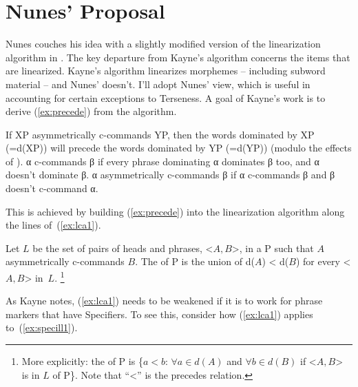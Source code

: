 \documentclass[output=paper]{langsci/langscibook}
\begin{document}
\section{Nunes' Proposal} %
\label{sec:nunesproposal}

Nunes couches his idea with a slightly modified version of the linearization
algorithm in \cite{Kayne1994}. The key departure from Kayne's algorithm
concerns the items that are linearized. Kayne's algorithm linearizes morphemes
-- including subword material -- and Nunes' doesn't. I'll adopt Nunes' view,
which is useful in accounting for certain exceptions to Terseness. A goal of
Kayne's work is to derive (\ref{ex:precede}) from the  algorithm.
\begin{exe}
	\ex \label{ex:precede}
    If XP asymmetrically c-commands YP, then the words dominated by XP (=d(XP))
    will precede the words dominated by YP (=d(YP)) (modulo the effects of
    ).
    \ex α c-commands β if every phrase dominating α dominates β too, and α
    doesn't dominate β. α asymmetrically c-commands β if α c-commands β and β
    doesn't c-command α.
\end{exe}

This is achieved by building (\ref{ex:precede}) into the linearization
algorithm along the lines of~(\ref{ex:lca1}).
\begin{exe}
	\ex \label{ex:lca1}
	\begin{xlist}
		\ex Let $L$ be the set of pairs of heads and phrases, <$A,B$>, in a  P such that $A$ asymmetrically c-commands $B$.
		\ex The  of P is the union of d($A$) < d($B$) for every <$A,B$> in~$L$.%
		\footnote{More explicitly: the  of P is \{$a<b$: $\forall a \in d(A)$ and $\forall b \in d(B)$ if <$A,B$> is in $L$ of P\}. Note that ``<'' is the precedes relation.} %
	\end{xlist}
\end{exe}

As Kayne notes, (\ref{ex:lca1}) needs to be weakened if it is to work for
phrase markers that have Specifiers. To see this, consider how (\ref{ex:lca1})
applies to~(\ref{ex:specill1}).
\ea\label{ex:specill1}
\z
\end{document}
